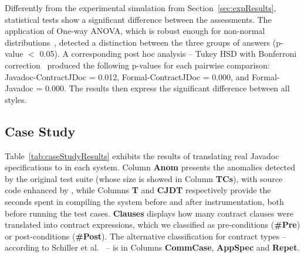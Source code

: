 \begin{figure}
\centering
\end{figure}


Differently from the experimental simulation from Section~\ref{sec:expResults}, statistical tests show a significant difference between the assessments. The application of One-way ANOVA, which is robust enough for non-normal distributions~\cite{statistical}, detected a distinction between the three groups of answers (p-value $<$ 0.05). A corresponding post hoc analysis -- Tukey HSD 
with Bonferroni correction~\cite{statistical} produced the following p-values for each pairwise comparison: Javadoc-ContractJDoc = 0.012, Formal-ContractJDoc = 0.000, and Formal-Javadoc = 0.000. The results then express the significant difference between all styles.




\subsection{Case Study}

Table~\ref{tab:caseStudyResults} exhibits the results of translating real Javadoc specifications to \contractjdoc{} in each system.
Column \textbf{Anom} presents the anomalies detected by the original test suite (whose size is showed in Column \textbf{TCs}), with source code enhanced by \contractjdoc{}, while Columns \textbf{T} and \textbf{CJDT} respectively provide the seconds spent in compiling the system before and after \contractjdoc{} instrumentation, both before running the test cases. 
\textbf{Clauses} displays how many contract clauses were translated into contract expressions, which we classified as pre-conditions (\textbf{\#Pre}) or post-conditions (\textbf{\#Post}). The alternative classification for contract types -- according to Schiller et al.~\cite{typeContracts} -- is in Columns \textbf{CommCase}, \textbf{AppSpec} and \textbf{Repet}.

